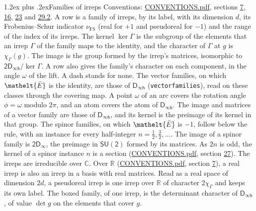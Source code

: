 \documentclass[10pt,a4paper]{article}
\makeatletter
\renewcommand\section{\@startsection{section}{1}{\z@}{-3ex plus -1ex minus -.2ex}%
  {1.2ex plus .2ex}{\normalfont\large\sffamily\bfseries\color{parttitle}}}
\numberwithin{equation}{section}
\newcommand{\eltfont}[1]{{\let\sigma\eltsigma\mathelt{#1}}}
\newcommand{\grp}[1]{\mathsf{#1}}
\newcommand{\elt}[1]{\eltfont{#1}}
\newcommand{\irchar}[1]{\chi_{#1}}
\newcommand{\fsind}{\nu_{\mathrm{FS}}}
\newcommand{\barred}[1]{\bar{#1}}
\makeatother
\begin{document}
\section{Families of irreps}\label{s:families}
Conventions: \href{../../CONVENTIONS.pdf}{CONVENTIONS.pdf}, sections \href{../../../rotation/CONVENTIONS.pdf\#conv.7}{7}, \href{../../../rotation/CONVENTIONS.pdf\#conv.16}{16}, \href{../../CONVENTIONS.pdf\#conv.23}{23} and \href{../../CONVENTIONS.pdf\#conv.29.2}{29.2}.
\leavevmode\label{n:head.family.irreps}\label{n:index.dimension}\label{n:index.frobenius}\label{n:head.index.family}A row is a family of irreps, by its label, with its dimension $d$, its Frobenius--Schur indicator $\fsind$ (real for $+1$ and pseudoreal for $-1$) and the range of the index of its irreps. \label{n:head.kernel}\label{n:function.character}The kernel $\ker\Gamma$ is the subgroup of the elements that an irrep $\Gamma$ of the family maps to the identity, and the character of $\Gamma$ at $g$ is $\irchar{\Gamma}(g)$. \label{n:head.image}The image is the group formed by the irrep's matrices, isomorphic to $\grp{2D_{\infty h}}/\ker\Gamma$. A row also gives the family's character on each component, in the angle $\omega$ of the lift. A dash stands for none. The vector families, on which $\elt{\barred{E}}$ is the identity, are those of \href{../../../rotation/data/pdf/Dinfh.pdf}{$\grp{D_{\infty h}}$} (\texttt{vectorfamilies}), read on these classes through the covering map. A point $\omega$ of an arc covers the rotation angle $\phi = \omega$ modulo $2\pi$, and an atom covers the atom of \href{../../../rotation/data/pdf/Dinfh.pdf}{$\grp{D_{\infty h}}$}. The image and matrices of a vector family are those of \href{../../../rotation/data/pdf/Dinfh.pdf}{$\grp{D_{\infty h}}$}, and its kernel is the preimage of its kernel in that group. The spinor families, on which $\elt{\barred{E}}$ is $-1$, follow below the rule, with an instance for every half-integer $n = \tfrac{1}{2}, \tfrac{3}{2}, \dots$. The image of a spinor family is \href{2Dinf.pdf}{$\grp{2D_{\infty }}$}, the preimage in $\grp{SU(2)}$ formed by its matrices. As $2n$ is odd, the kernel of a spinor instance $n$ is a section (\href{../../CONVENTIONS.pdf}{CONVENTIONS.pdf}, section \href{../../CONVENTIONS.pdf\#conv.27}{27}). The irreps are irreducible over $\mathbb{C}$. Over $\mathbb{R}$ (\href{../../CONVENTIONS.pdf}{CONVENTIONS.pdf}, section \href{../../../rotation/CONVENTIONS.pdf\#conv.7}{7}), a real irrep is also an irrep in a basis with real matrices. Read as a real space of dimension $2d$, a pseudoreal irrep is one irrep over $\mathbb{R}$ of character $2\irchar{\Gamma}$ and keeps its own label. \label{n:mark.determinant}The boxed family, of one irrep, is the determinant character of \href{../../../rotation/data/pdf/Dinfh.pdf}{$\grp{D_{\infty h}}$}, of value $\det g$ on the elements that cover $g$.
\end{document}
